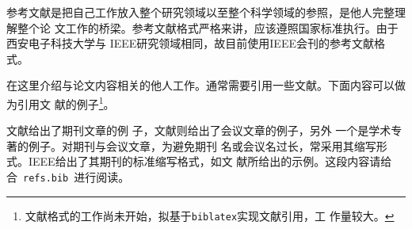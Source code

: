 

\begin{thebibliography}

参考文献是把自己工作放入整个研究领域以至整个科学领域的参照，是他人完整理解整个论
文工作的桥梁。参考文献格式严格来讲，应该遵照国家标准执行。由于西安电子科技大学与
IEEE研究领域相同，故目前使用IEEE会刊的参考文献格式。


在这里介绍与论文内容相关的他人工作。通常需要引用一些文献。下面内容可以做为引用文
献的例子\footnote{文献格式的工作尚未开始，拟基于\texttt{biblatex}实现文献引用，工
  作量较大。}。

文献给出了期刊文章的例
子，文献则给出了会议文章的例子，另外
一个是学术专著\cite{book11:_examp_book_title}的例子。对期刊与会议文章，为避免期刊
名或会议名过长，常采用其缩写形式。IEEE给出了其期刊的标准缩写格式，如文
献所给出的示例。这段内容请给
合~\texttt{refs.bib}~进行阅读。
\end{thebibliography}
